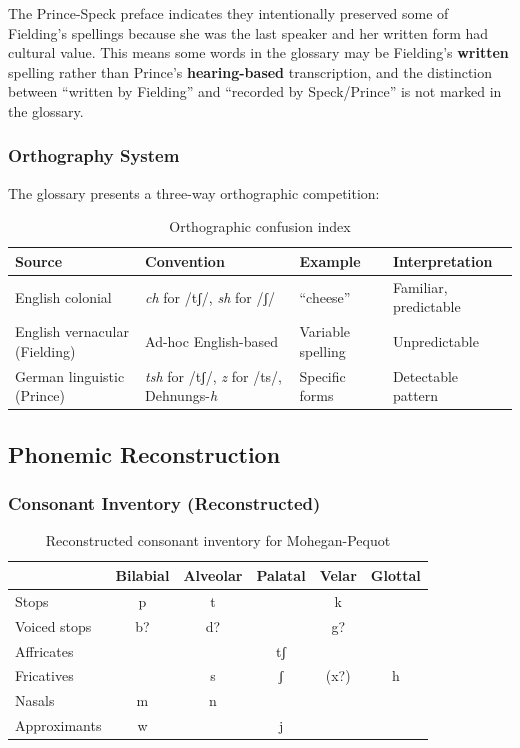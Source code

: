 The Prince-Speck preface indicates they intentionally preserved some of
Fielding's spellings because she was the last speaker and her written form
had cultural value. This means some words in the glossary may be Fielding's
\textbf{written} spelling rather than Prince's \textbf{hearing-based}
transcription, and the distinction between ``written by Fielding'' and
``recorded by Speck/Prince'' is not marked in the glossary.

\subsubsection{Orthography System}

The glossary presents a three-way orthographic competition:

\begin{table}[h]
\centering
\begin{tabular}{llll}
\toprule
\textbf{Source} & \textbf{Convention} & \textbf{Example} & \textbf{Interpretation} \\
\midrule
English colonial & \textit{ch} for /tʃ/, \textit{sh} for /ʃ/ & ``cheese'' & Familiar, predictable \\
English vernacular (Fielding) & Ad-hoc English-based & Variable spelling & Unpredictable \\
German linguistic (Prince) & \textit{tsh} for /tʃ/, \textit{z} for /ts/, Dehnungs-\textit{h} & Specific forms & Detectable pattern \\
\bottomrule
\end{tabular}
\caption{Orthographic confusion index}
\label{tab:1368-orthographic}
\end{table}

\subsection{Phonemic Reconstruction}
\label{sec:1368-phonemic}

\subsubsection{Consonant Inventory (Reconstructed)}

\begin{table}[h]
\centering
\begin{tabular}{lccccc}
\toprule
 & Bilabial & Alveolar & Palatal & Velar & Glottal \\
\midrule
Stops & p & t & & k & \\
Voiced stops & b? & d? & & g? & \\
Affricates & & & tʃ & & \\
Fricatives & & s & ʃ & (x?) & h \\
Nasals & m & n & & & \\
Approximants & w & & j & & \\
\bottomrule
\end{tabular}
\caption{Reconstructed consonant inventory for Mohegan-Pequot}
\label{tab:1368-consonants}
\end{table}

